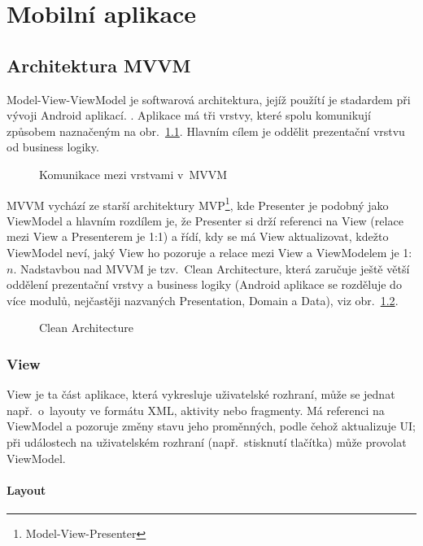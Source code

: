 \documentclass[twoside]{ctuthesis}
\begin{document}
%
\chapter{Mobilní aplikace}
%
\section{Architektura MVVM}

Model-View-ViewModel je softwarová architektura, jejíž použítí je sta\-dar\-dem při vývoji Android aplikací. \cite{android2020guide}. Aplikace má tři vrstvy, které spolu komunikují způsobem naznačeným na obr.~\ref{fig:mvvm}. Hlavním cílem je oddělit prezentační vrstvu od business logiky.  \cite{shekhar2020mvvm}

\begin{figure}[h!]
	
	\caption{Komunikace mezi vrstvami v~MVVM}
	\label{fig:mvvm}
\end{figure}

MVVM vychází ze starší architektury MVP\footnote{Model-View-Presenter}, kde Presenter je podobný jako ViewModel a hlavním rozdílem je, že Presenter si drží referenci na View (relace mezi View a Presenterem je 1:1) a řídí, kdy se má View aktualizovat, kdežto ViewModel neví, jaký View ho pozoruje a relace mezi View a ViewModelem je 1:$n$. \cite{vogel2017android} Nadstavbou nad MVVM je tzv.~Clean Architecture, která zaručuje ještě větší oddělení prezentační vrstvy a business logiky (Android aplikace se rozděluje do více modulů, nejčastěji nazvaných Presentation, Domain a Data), viz obr.~\ref{fig:clean-architecture}. \cite{jain2019kotlin}

\begin{figure}[h!]
	
	\caption{Clean Architecture}
	\label{fig:clean-architecture}
\end{figure}


\subsection{View}

View je ta část aplikace, která vykresluje uživatelské rozhraní, může se jednat např.~o~layouty ve formátu XML, aktivity nebo fragmenty. Má referenci na ViewModel a pozoruje změny stavu jeho proměnných, podle čehož aktualizuje UI; při událostech na uživatelském rozhraní (např.~stisknutí tlačítka) může provolat ViewModel.

\subsubsection{Layout}
\end{document}
